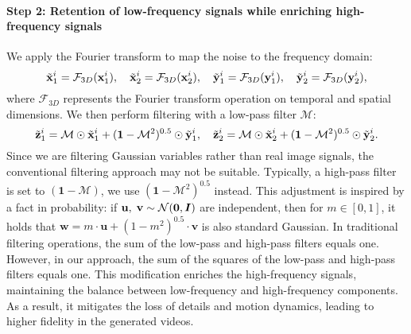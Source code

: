 \paragraph{Step 2: Retention of low-frequency signals while enriching high-frequency signals}
We apply the Fourier transform to map the noise to the frequency domain:
\begin{equation}
    \Tilde{\mathbf{x}}_1^i=\mathcal{F}_{3D}(\mathbf{x}_1^i),\quad 
    \Tilde{\mathbf{x}}_2^i=\mathcal{F}_{3D}(\mathbf{x}_2^i),\quad 
    \Tilde{\mathbf{y}}_1^i=\mathcal{F}_{3D}(\mathbf{y}_1^i),\quad
    \Tilde{\mathbf{y}}_2^i=\mathcal{F}_{3D}(\mathbf{y}_2^i),
\end{equation}
where $\mathcal{F}_{3D}$ represents the Fourier transform operation on temporal and spatial dimensions.
We then perform filtering with a low-pass filter $\mathcal{M}$:
\begin{equation}
    \Tilde{\mathbf{z}}_1^i=\mathcal{M}\odot\Tilde{\mathbf{x}}_1^i + (\bm{1}-\mathcal{M}^2)^{0.5}\odot\Tilde{\mathbf{y}}_1^i,
    \quad
    \Tilde{\mathbf{z}}_2^i=\mathcal{M}\odot\Tilde{\mathbf{x}}_2^i + (\bm{1}-\mathcal{M}^2)^{0.5}\odot\Tilde{\mathbf{y}}_2^i.
\end{equation}
Since we are filtering Gaussian variables rather than real image signals, the conventional filtering approach may not be suitable. Typically, a high-pass filter is set to $(\bm{1}-\mathcal{M})$, we use $(\bm{1}-\mathcal{M}^2)^{0.5}$ instead. 
This adjustment is inspired by a fact in probability: if $\mathbf{u},\;\mathbf{v} \sim\mathcal{N}(\mathbf{0}, {\bm{I}})$ are independent, then for $m\in\left[0, 1\right]$, it holds that $\mathbf{w} = m \cdot \mathbf{u} + (1-m^2)^{0.5} \cdot \mathbf{v}$
is also standard Gaussian.
In traditional filtering operations, the sum of the low-pass and high-pass filters equals one. However, in our approach, the sum of the squares of the low-pass and high-pass filters equals one.
This modification enriches the high-frequency signals, maintaining the balance between low-frequency and high-frequency components. As a result, it mitigates the loss of details and motion dynamics, leading to higher fidelity in the generated videos.

